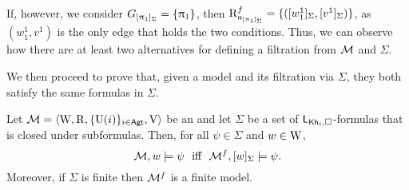 \begin{example}
\begin{center}
\end{center}

If, however, we consider $G_{[\uppi_1]_\Sigma} = \{ \uppi_1 \}$, then $\operatorname{R}^f_{a_{[\uppi_1]_\Sigma}} = \{ ([w^1_1]_\Sigma,[v^1]_\Sigma) \}$, as $(w^1_1,v^1)$ is the only edge that holds the two conditions. Thus, we can observe how there are at least two alternatives for defining a filtration from $\mathcal{M}$ and $\Sigma$.
\end{example}

\medskip

We then proceed to prove that, given a model and its filtration via $\Sigma$, they both satisfy the same formulas in $\Sigma$.

\medskip

\begin{theorem}\label{th:filtration}
Let $\mathcal{M} = \langle \operatorname{W},\operatorname{R}, \{ \operatorname{U}(i) \}_{i\in {\rm \sf Agt}}, \operatorname{V} \rangle$ be an \ults and
let $\Sigma$ be a set of $\mathsf{L}_{{\sf Kh}_i,\square}$-formulas that is closed under subformulas.
Then, for all $\psi \in \Sigma$ and $w \in \operatorname{W}$, 
\[
    \modults,w\models \psi \ \mbox{  iff  } \ \modults^f,[w]_\Sigma\models \psi.
\] 
Moreover, if $\Sigma$ is finite then $\mathcal{M}^f$ is a finite model.
\end{theorem}

